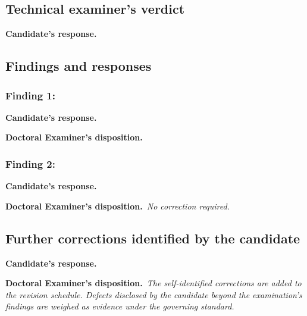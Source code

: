 \documentclass[11pt]{article}
\newcommand{\examinerRole}{Doctoral Examiner}
\newif\ifdraftnotes     \draftnotesfalse     %
\newenvironment{response}{%
  \par\medskip
  \begin{list}{}{\setlength{\leftmargin}{1.6em}\setlength{\rightmargin}{0.8em}}
  \item\relax\small\textbf{Candidate's response.}\hspace{0.5em}\ignorespaces}%
  {\end{list}\par\medskip}
\newcommand{\sev}[1]{\par\smallskip{\itshape Severity: #1.}\par}
\newcommand{\disposition}[1]{\par\smallskip\noindent\textbf{\examinerRole's
  disposition.}\ \emph{#1}\par\medskip}
\newcommand{\finding}[1]{\subsubsection*{#1}}
\newcommand{\note}[1]{\ifdraftnotes\textcolor{red}{\small[\,#1\,]}\fi}
\begin{document}
\subsection*{Technical examiner's verdict}

\note{The sound core; where the defects concentrate; whether any is fatal and
to what (a theorem, a section, or the paper); the recommended architecture of
the repair.}

\begin{response}
\note{The candidate's global response: acceptance or contestation, the
verification performed, and the dependency surface into companion papers.}
\end{response}

\subsection*{Findings and responses}

\finding{Finding 1: \note{Short title}}
\note{What the manuscript claims, where. What is actually the case, with the
evidence. The consequence and the recommended repair.}
\sev{\note{fatal to X / major / major but straightforward / repairable /
minor / expositional}}
\begin{response}
\note{Accepted, contested, or accepted with refinement; what was verified;
what the revision does.}
\end{response}
\disposition{\note{Adjudication in one or two sentences. End with
``Correction scheduled.'' when a line is owed in the revision summary.}}

\finding{Finding 2: \note{Short title of an endorsement}}
\note{Endorsements carry no severity line.}
\begin{response}
\note{Response.}
\end{response}
\disposition{No correction required.}

\subsection*{Further corrections identified by the candidate}

\begin{response}
\note{Defects disclosed by the candidate beyond the examination's findings.}
\end{response}
\disposition{The self-identified corrections are added to the revision
schedule. Defects disclosed by the candidate beyond the examination's findings
are weighed as evidence under the governing standard.}
\end{document}

